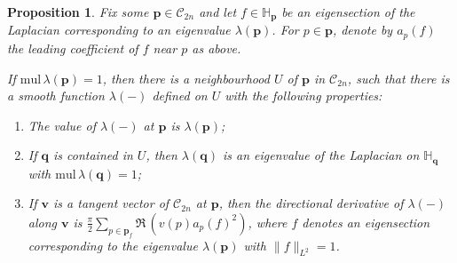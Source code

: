 \documentclass[11pt]{amsart}
\newtheorem{proposition}[theorem]{Proposition}
\newcommand{\mbH}{\mathbb{H}}
\newcommand{\mbp}{\mathbf{p}}
\newcommand{\mbq}{\mathbf{q}}
\newcommand{\mbv}{\mathbf{v}}
\begin{document}
\begin{proposition}{\cite[Proposition 2.5, Proposition 2.6]{taubes2021topological}}
	\label{prop_deformation}
	Fix some $\mathbf{p}\in\mathcal{C}_{2n}$ and let $f\in \mbH_{\mbp}$ be an eigensection of the Laplacian corresponding to an eigenvalue $\lambda(\mathbf{p})$. For $p\in\mbp$, denote by $a_p(f)$ the leading coefficient of $f$ near $p$ as above. 
	
	If $\mathrm{mul}\,\lambda(\mathbf{p}) =1$, then there is a neighbourhood $U$ of $\mbp$ in $\mathcal{C}_{2n}$, such that there is a smooth function $\lambda(-)$ defined on $U$ with the following properties:
	\begin{enumerate}
		\item The value of $\lambda{(-)}$ at $\mathbf{p}$ is $\lambda(\mathbf{p})$;
		\item If $\mathbf{q}$ is contained in $U$, then $\lambda{(\mathbf{q})}$ is an eigenvalue of the Laplacian on $\mbH_\mbq$ with $\mathrm{mul}\,\lambda{(\mathbf{q})}=1$;
		\item If $\mbv$ is a tangent vector of $\mathcal{C}_{2n}$ at $\mathbf{p}$, then the directional derivative of $\lambda{(-)}$ along $\mbv$ is $\frac{\pi}{2}\sum_{p\in \mathbf{p}_f}\Re\,(v(p)a_{p}(f)^2)$, where $f$ denotes an eigensection corresponding to the eigenvalue $\lambda(\mathbf{p})$ with $\|f\|_{L^2}=1$.
	\end{enumerate}
	

\end{proposition}
\end{document}
